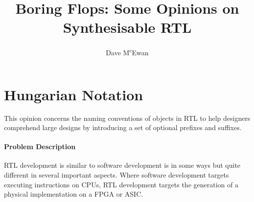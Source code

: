 \documentclass[a4paper]{article}
\newcommand{\doctitle}{{Boring Flops: Some Opinions on Synthesisable RTL}}
\begin{document}

\title{
  \doctitle
}

\author{
  Dave M\textsuperscript{c}Ewan
}

\maketitle

\begin{abstract}
\end{abstract}



\section{Hungarian Notation} %
\label{sec:HungarianNotation}
This opinion concerns the naming conventions of objects in \gls{RTL} to help
designers comprehend large designs by introducing a set of optional prefixes
and suffixes.

\paragraph{Problem Description} %
\label{sec:HungarianNotation_problem}

\gls{RTL} development is similar to software development is in some ways but
quite different in several important aspects.
Where software development targets executing instructions on
\glspl{CPU}, \gls{RTL} development targets the generation of a physical
implementation on a \gls{FPGA} or \gls{ASIC}.
\end{document}
